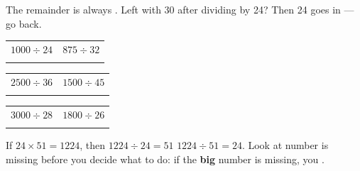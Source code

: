\documentclass[12pt,a4paper]{article}
\begin{document}

\noindent The remainder is always . Left with 30 after
dividing by 24? Then 24 goes in  --- go back.

\vspace{6pt}
\noindent
\begin{tabularx}{\textwidth}{|X|X|}
  \hline
  $1000 \div 24$ & $875 \div 32$ \\
  \rule[-3.4em]{0pt}{4.2em} & \\
  \hline
\end{tabularx}

\vspace{9pt}
\noindent
\begin{tabularx}{\textwidth}{|X|X|}
  \hline
  $2500 \div 36$ & $1500 \div 45$ \\
  \rule[-3.6em]{0pt}{4.4em} & \\
  \hline
\end{tabularx}

\vspace{9pt}
\noindent
\begin{tabularx}{\textwidth}{|X|X|}
  \hline
  $3000 \div 28$ & $1800 \div 26$ \\
  \rule[-3.6em]{0pt}{4.4em} & \\
  \hline
\end{tabularx}


\begin{remember}
  If $24 \times 51 = 1224$, then $1224 \div 24 = 51$  $1224 \div 51 = 24$.
  Look at  number is missing before you decide what to do: if the
  \textbf{big} number is missing, you .
\end{remember}
\end{document}
